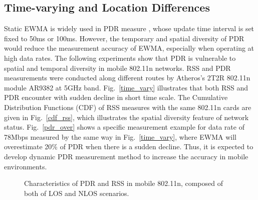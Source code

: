 \documentclass[draftclsnofoot,journal,onecolumn,11pt]{IEEEtran}
\begin{document}
\subsection{Time-varying and Location Differences}
Static EWMA is widely used in PDR measure \cite{ath9k} \cite{minstrel} \cite{wong2008wireless}, whose update time interval is set fixed to 50ms or 100ms. However, the temporary and spatial diversity of PDR would reduce the measurement accuracy of EWMA, especially when operating at high data rates. The following experiments show that PDR is vulnerable to spatial and temporal diversity in mobile 802.11n networks. RSS and PDR measurements were conducted along different routes by Atheros's 2T2R 802.11n module AR9382 at 5GHz band. Fig.~\ref{time_vary} illustrates that both RSS and PDR encounter with sudden decline in short time scale. The Cumulative Distribution Functions (CDF) of RSS measures with the same 802.11n cards are given in Fig.~\ref{cdf_rss}, which illustrates the spatial diversity feature of network status. Fig.~\ref{pdr_over} shows a specific measurement example for data rate of 78Mbps measured by the same way in Fig.~\ref{time_vary}, where EWMA will overestimate 20\% of PDR when there is a sudden decline. Thus, it is expected to develop dynamic PDR measurement method to increase the accuracy in mobile environments.

\begin{figure}[!htp]
\centerline{
}
\caption{Characteristics of PDR and RSS in mobile 802.11n, composed of both of LOS and NLOS scenarios.}
\label{time}
\end{figure}
\end{document}

